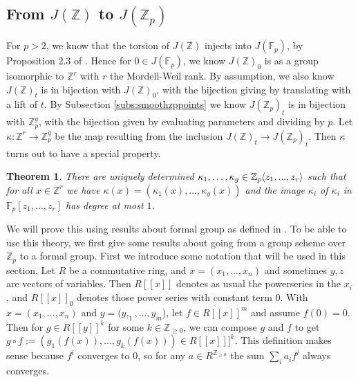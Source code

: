 \documentclass{article}
\newcommand{\Z}{\mathbb{Z}}
\newcommand{\F}{\mathbb{F}}
\renewcommand{\angle}[1]{\hspace{-2pt}\left\langle #1 \right\rangle}
\theoremstyle{plain}
\newtheorem{thm}{Theorem}[section] %
\theoremstyle{definition}
\theoremstyle{remark}
\begin{document}
\subsection{From \texorpdfstring{$J(\Z)$}{J(Z)} to \texorpdfstring{$J(\Z_p)$}{J(Z\_p)}}
For $p > 2$, we know that the torsion of $J(\Z)$ injects into $J(\F_p)$, by Proposition 2.3 of \cite{pierre2000}. Hence for $0 \in J(\F_p)$, we know $J(\Z)_0$ is as a group isomorphic to $\Z^r$ with $r$ the Mordell-Weil rank. By assumption, we also know $J(\Z)_t$ is in bijection with $J(\Z)_0$, with the bijection giving by translating with a lift of $t$. By Subsection \ref{subs:smoothzppoints} we know $J(\Z_p)_t$ is in bijection with $\Z_p^{g}$, with the bijection given by evaluating parameters and dividing by $p$. Let $\kappa: \Z^r \to \Z_p^g$ be the map resulting from the inclusion $J(\Z)_t \to J(\Z_p)_t$. Then $\kappa$ turns out to have a special property.

\begin{thm}
\label{thm:kappanice}
There are uniquely determined $\kappa_1,\dots,\kappa_g \in \Z_p\angle{z_1,...,z_r}$ such that for all $x \in \Z^r$ we have $\kappa(x) = (\kappa_1(x),\dots,\kappa_g(x))$ and the image $\overline{\kappa_i}$ of $\kappa_i$ in $\F_p[z_1,...,z_r]$ has degree at most $1$.
\end{thm}

We will prove this using results about formal group as defined in \citep{honda70}. To be able to use this theory, we first give some results about going from a group scheme over $\Z_p$ to a formal group.
First we introduce some notation that will be used in this section. Let $R$ be a commutative ring, and $x = (x_1,\dots,x_n)$ and sometimes $y,z$ are vectors of variables. Then $R[[x]]$ denotes as usual the powerseries in the $x_i$, and $R[[x]]_0$ denotes those power series with constant term $0$. With $x = (x_1,\dots,x_n)$ and $y = (y,_1,\dots,y_m$), let $f \in R[[x]]^m$ and assume $f(0) = 0$. Then for $g \in R[[y]]^k$ for some $k\in\Z_{\geq 0}$, we can compose $g$ and $f$ to get $g\circ f := (g_1(f(x)),\dots,g_k(f(x)))\in R[[x]]]^k$. This definition makes sense because $f^i$ converges to $0$, so for any $a \in R^{\Z_{\geq 0}} $ the sum $\sum_i a_i f^i$ always converges. 
\end{document}
